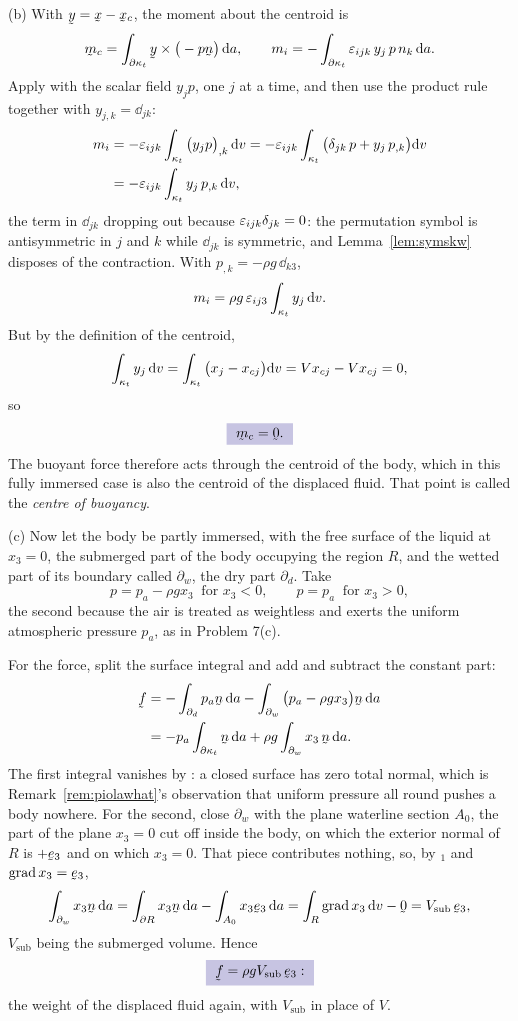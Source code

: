 \begin{solution}
(b) With $\by=\bx-\bx_{c}$, the moment about the centroid is
\[
   \bmm_{c}=\int_{\partial\kappa_{t}}\by\times\big(-p\bn\big)\,\dl a ,
   \qquad
   m_{i}=-\int_{\partial\kappa_{t}}\eps_{ijk}\,y_{j}\,p\,n_{k}\,\dl a .
\]
Apply  with the scalar field $y_{j}p$, one $j$ at a time, and
then use the product rule together with $y_{j,k}=\dd_{jk}$:
\[
\begin{aligned}
   m_{i}&=-\varepsilon_{ijk}\int_{\kappa_{t}}\big(y_{j}p\big)_{,k}\,\mathrm{d} v
   =-\varepsilon_{ijk}\int_{\kappa_{t}}
     \big(\delta_{jk}\,p+y_{j}\,p_{,k}\big)\mathrm{d} v\\
   &=-\varepsilon_{ijk}\int_{\kappa_{t}}y_{j}\,p_{,k}\,\mathrm{d} v ,
\end{aligned}
\]
the term in $\dd_{jk}$ dropping out because $\varepsilon_{ijk}\delta_{jk}=0$: the
permutation symbol is antisymmetric in $j$ and $k$ while $\dd_{jk}$ is
symmetric, and Lemma~\ref{lem:symskw} disposes of the contraction. With
$p_{,k}=-\rho g\,\dd_{k3}$,
\[
   m_{i}=\rho g\,\varepsilon_{ij3}\int_{\kappa_{t}}y_{j}\,\mathrm{d} v .
\]
But by the definition of the centroid,
\[
   \int_{\kappa_{t}}y_{j}\,\mathrm{d} v
   =\int_{\kappa_{t}}\big(x_{j}-x_{cj}\big)\mathrm{d} v
   =V x_{cj}-V x_{cj}=0 ,
\]
so
\[
   \boxed{\ \bmm_{c}=\bze . \ }
\]
The buoyant force therefore acts through the centroid of the body, which
in this fully immersed case is also the centroid of the displaced fluid.
That point is called the \emph{centre of buoyancy}.

(c) Now let the body be partly immersed, with the free surface
of the liquid at $x_{3}=0$, the submerged part of the body occupying the
region $R$, and the wetted part of its boundary called
$\partial_{w}$, the dry part $\partial_{d}$. Take
\[
   p=p_{a}-\rho g x_{3}\ \text{ for } x_{3}<0,
   \qquad
   p=p_{a}\ \text{ for } x_{3}>0,
\]
the second because the air is treated as weightless and exerts the
uniform atmospheric pressure $p_{a}$, as in Problem 7(c).

For the force, split the surface integral and add and subtract the
constant part:
\[
\begin{aligned}
   \bff&=-\int_{\partial_{d}}p_{a}\bn\,\dl a
   -\int_{\partial_{w}}\big(p_{a}-\rho gx_{3}\big)\bn\,\dl a\\
   &=-p_{a}\int_{\partial\kappa_{t}}\bn\,\dl a
   +\rho g\int_{\partial_{w}}x_{3}\,\bn\,\dl a .
\end{aligned}
\]
The first integral vanishes by : a closed surface has zero
total normal, which is Remark~\ref{rem:piolawhat}'s observation that
uniform pressure all round pushes a body nowhere. For the second, close
$\partial_{w}$ with the plane waterline section $A_{0}$, the part of the
plane $x_{3}=0$ cut off inside the body, on which the exterior normal of
$R$ is $+\be_{3}$ and on which $x_{3}=0$. That piece contributes
nothing, so, by $_{1}$ and $\grad x_{3}=\be_{3}$,
\[
   \int_{\partial_{w}}x_{3}\bn\,\dl a
   =\int_{\partial R}x_{3}\bn\,\dl a-\int_{A_{0}}x_{3}\be_{3}\,\dl a
   =\int_{R}\grad x_{3}\,\dl v-\bze
   =V_{\text{sub}}\,\be_{3},
\]
$V_{\text{sub}}$ being the submerged volume. Hence
\[
   \boxed{\ \bff=\rho g V_{\text{sub}}\,\be_{3} :\ }
\]
the weight of the displaced fluid again, with $V_{\text{sub}}$ in place
of $V$.


\end{solution}
